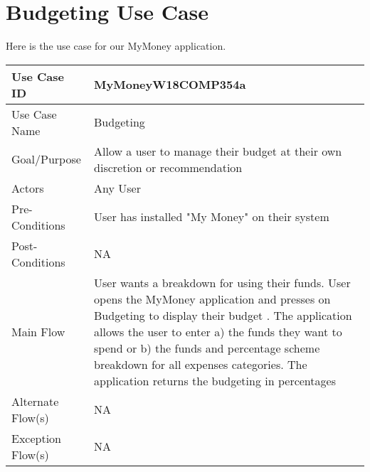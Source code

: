 \documentclass{article}
\begin{document}
\section{Budgeting Use Case}
Here is the use case for our MyMoney application.

\medskip
\begin{center}
\begin{tabular}{| l | p{10cm} |}
\hline

Use Case ID  & MyMoneyW18COMP354a\\
\hline
Use Case Name  & Budgeting\\
\hline
Goal/Purpose  & Allow a user to manage their budget at their own discretion or recommendation\\
\hline
Actors  & Any User\\
\hline
Pre-Conditions &  User has installed "My Money" on their system \\
\hline
Post-Conditions & NA \\
\hline
Main Flow & User wants a breakdown for using their funds\newline
1.  User opens the MyMoney application and presses on Budgeting to display their budget \newline
2.  The application allows the user to enter a) the funds they want to spend or b) the funds and percentage scheme breakdown for all expenses categories\newline
3.  The application returns the budgeting in percentages\newline
\\
\hline
Alternate Flow(s) & NA

\\
\hline
Exception Flow(s) & NA \\
\hline

\end{tabular}
\end{center}
\end{document}
